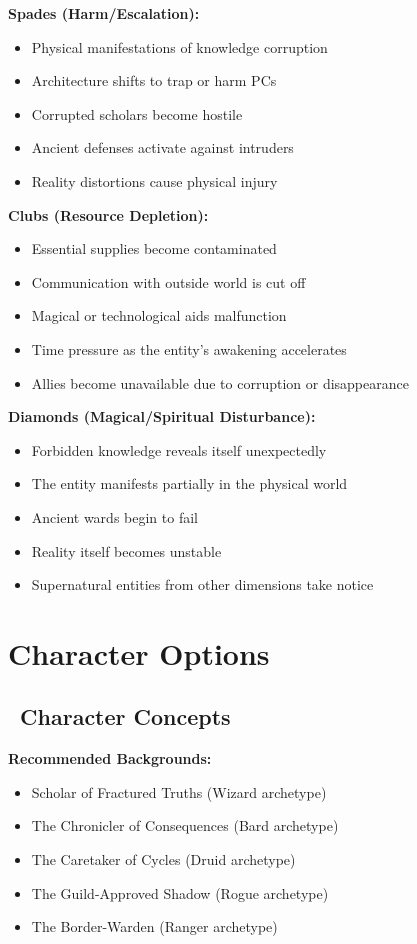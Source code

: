 \documentclass[11pt]{article}
\begin{document}
\textbf{Spades (Harm/Escalation):}
\begin{itemize}
    \item Physical manifestations of knowledge corruption
    \item Architecture shifts to trap or harm PCs
    \item Corrupted scholars become hostile
    \item Ancient defenses activate against intruders
    \item Reality distortions cause physical injury
\end{itemize}

\textbf{Clubs (Resource Depletion):}
\begin{itemize}
    \item Essential supplies become contaminated
    \item Communication with outside world is cut off
    \item Magical or technological aids malfunction
    \item Time pressure as the entity's awakening accelerates
    \item Allies become unavailable due to corruption or disappearance
\end{itemize}

\textbf{Diamonds (Magical/Spiritual Disturbance):}
\begin{itemize}
    \item Forbidden knowledge reveals itself unexpectedly
    \item The entity manifests partially in the physical world
    \item Ancient wards begin to fail
    \item Reality itself becomes unstable
    \item Supernatural entities from other dimensions take notice
\end{itemize}

\section{Character Options}

\subsection*{\faUser\ Character Concepts}

\textbf{Recommended Backgrounds:}
\begin{itemize}
    \item Scholar of Fractured Truths (Wizard archetype)
    \item The Chronicler of Consequences (Bard archetype)
    \item The Caretaker of Cycles (Druid archetype)
    \item The Guild-Approved Shadow (Rogue archetype)
    \item The Border-Warden (Ranger archetype)
\end{itemize}
\end{document}
